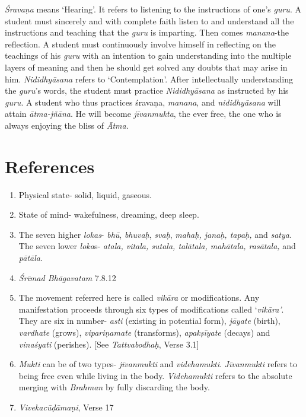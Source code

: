 \emph{Śravaṇa} means `Hearing'. It refers to listening to the instructions of one's \emph{guru}. A student must sincerely and with complete faith listen to and understand all the instructions and teaching that the \emph{guru} is imparting. Then comes \emph{manana}-the reflection. A student must continuously involve himself in reflecting on the teachings of his \emph{guru} with an intention to gain understanding into the multiple layers of meaning and then he should get solved any doubts that may arise in him. \emph{Nididhyāsana} refers to `Contemplation'. After intellectually understanding the \emph{guru}'s words, the student must practice \emph{Nididhyāsana} as instructed by his \emph{guru}. A student who thus practices śravaṇa, \emph{manana}, and \emph{nididhyāsana} will attain \emph{ātma-jñāna}. He will become \emph{jīvanmukta}, the ever free, the one who is always enjoying the bliss of \emph{Ātma}.

\section*{References}

\begin{enumerate}
\itemsep=0pt
\item
  Physical state- solid, liquid, gaseous.
\item
  State of mind- wakefulness, dreaming, deep sleep.
\item
  The seven higher \emph{lokas}- \emph{bhū}, \emph{bhuvaḥ}, \emph{svaḥ}, \emph{mahaḥ, janaḥ, tapaḥ,} and \emph{satya}. The seven lower \emph{loka}s- \emph{atala, vitala, sutala, talātala, mahātala, rasātala,} and \emph{pātāla}.
\item
  \emph{Śrīmad Bhāgavatam} 7.8.12
\item
  The movement referred here is called \emph{vikāra} or modifications. Any manifestation proceeds through six types of modifications called `\emph{vikāra'}. They are six in number- \emph{asti} (existing in potential form), \emph{jāyate} (birth), \emph{vardhate} (grows), \emph{vipariṇamate} (transforms), \emph{apakṣīyate} (decays) and \emph{vinaśyati} (perishes). {[}See \emph{Tattvabodhaḥ}, Verse 3.1{]}
\item
  \emph{Mukti} can be of two types- \emph{jīvanmukti} and \emph{videhamukti}. \emph{Jīvanmukti} refers to being free even while living in the body. \emph{Videhamukti} refers to the absolute merging with \emph{Brahman} by fully discarding the body.
\item
  \emph{Vivekacūḍāmaṇi}, Verse 17
\end{enumerate}

